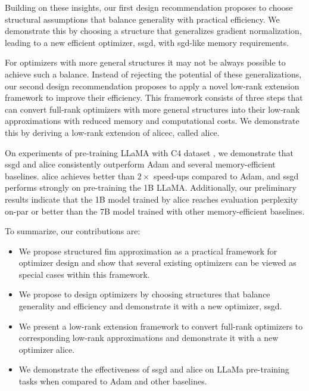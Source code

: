 Building on these insights, our first design recommendation proposes to choose structural assumptions that balance generality with practical efficiency. We demonstrate this by choosing a structure that generalizes gradient normalization, leading to a new efficient optimizer, \gls{ssgd}, with \gls{sgd}-like memory requirements.

For optimizers with more general structures it may not be always possible to achieve such a balance. Instead of rejecting the potential of these generalizations, our second design recommendation proposes to apply a novel low-rank extension framework to improve their efficiency. This framework consists of three steps that can convert full-rank optimizers with more general structures into their low-rank approximations with reduced memory and computational costs. 
We demonstrate this by deriving a low-rank extension of \gls{alicec}, called \gls{alice}. 

On experiments of pre-training LLaMA \citep{touvron2023llama} with C4 dataset \citep{raffel2020C4}, we demonstrate that \gls{ssgd} and \gls{alice} consistently outperform Adam and several memory-efficient baselines. \gls{alice} achieves better than $2\times$ speed-ups compared to Adam, and \gls{ssgd} performs strongly on pre-training the 1B LLaMA. Additionally, our preliminary results indicate that the 1B model trained by \gls{alice} reaches evaluation perplexity on-par or better than the 7B model trained with other memory-efficient baselines. 

To summarize, our contributions are:
\begin{itemize}
    \item We propose structured \gls{fim} approximation as a practical framework for optimizer design and show that several existing optimizers can be viewed as special cases within this framework.
    \item We propose to design optimizers by choosing structures that balance generality and efficiency and demonstrate it with a new optimizer, \gls{ssgd}.
    \item We present a low-rank extension framework to convert full-rank optimizers to corresponding low-rank approximations and demonstrate it with a new optimizer \gls{alice}.
    \item We demonstrate the effectiveness of \gls{ssgd} and \gls{alice} on LLaMa pre-training tasks when compared to Adam and other baselines. 
\end{itemize}
